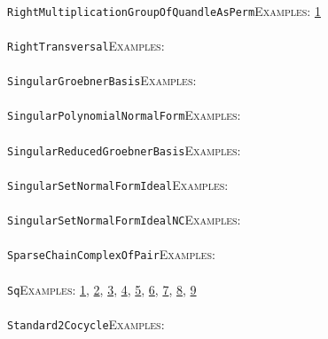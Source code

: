 \documentclass[a4paper,11pt]{report}
\begin{document}
{{ \\
 \texttt{RightMultiplicationGroupOfQuandleAsPerm}{\nobreakspace}{\nobreakspace}{\nobreakspace}{\nobreakspace}\textsc{Examples:} \href{../www/SideLinks/About/aboutQuandles.html} {1}{\nobreakspace} \\
 \\
 \texttt{RightTransversal}{\nobreakspace}{\nobreakspace}{\nobreakspace}{\nobreakspace}\textsc{Examples:} \\
 \\
 \texttt{SingularGroebnerBasis}{\nobreakspace}{\nobreakspace}{\nobreakspace}{\nobreakspace}\textsc{Examples:} \\
 \\
 \texttt{SingularPolynomialNormalForm}{\nobreakspace}{\nobreakspace}{\nobreakspace}{\nobreakspace}\textsc{Examples:} \\
 \\
 \texttt{SingularReducedGroebnerBasis}{\nobreakspace}{\nobreakspace}{\nobreakspace}{\nobreakspace}\textsc{Examples:} \\
 \\
 \texttt{SingularSetNormalFormIdeal}{\nobreakspace}{\nobreakspace}{\nobreakspace}{\nobreakspace}\textsc{Examples:} \\
 \\
 \texttt{SingularSetNormalFormIdealNC}{\nobreakspace}{\nobreakspace}{\nobreakspace}{\nobreakspace}\textsc{Examples:} \\
 \\
 \texttt{SparseChainComplexOfPair}{\nobreakspace}{\nobreakspace}{\nobreakspace}{\nobreakspace}\textsc{Examples:} \\
 \\
 \texttt{Sq}{\nobreakspace}{\nobreakspace}{\nobreakspace}{\nobreakspace}\textsc{Examples:} \href{tutorial/chap7.html} {1}{\nobreakspace}, \href{../www/SideLinks/About/aboutArtinGroups.html} {2}{\nobreakspace}, \href{../www/SideLinks/About/aboutModPRings.html} {3}{\nobreakspace}, \href{../www/SideLinks/About/aboutAspherical.html} {4}{\nobreakspace}, \href{../www/SideLinks/About/aboutNonabelian.html} {5}{\nobreakspace}, \href{../www/SideLinks/About/aboutQuandles2.html} {6}{\nobreakspace}, \href{../www/SideLinks/About/aboutKnots.html} {7}{\nobreakspace}, \href{../www/SideLinks/About/aboutTensorSquare.html} {8}{\nobreakspace}, \href{../www/SideLinks/About/aboutKnotsQuandles.html} {9}{\nobreakspace} \\
 \\
 \texttt{Standard2Cocycle}{\nobreakspace}{\nobreakspace}{\nobreakspace}{\nobreakspace}\textsc{Examples:} \\
}}
\end{document}
